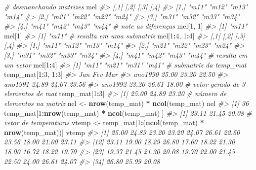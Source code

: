 \documentclass[]{book}
\newenvironment{Shaded}{\begin{snugshade}}{\end{snugshade}}
\newcommand{\KeywordTok}[1]{\textcolor[rgb]{0.13,0.29,0.53}{\textbf{#1}}}
\newcommand{\DecValTok}[1]{\textcolor[rgb]{0.00,0.00,0.81}{#1}}
\newcommand{\StringTok}[1]{\textcolor[rgb]{0.31,0.60,0.02}{#1}}
\newcommand{\CommentTok}[1]{\textcolor[rgb]{0.56,0.35,0.01}{\textit{#1}}}
\newcommand{\OperatorTok}[1]{\textcolor[rgb]{0.81,0.36,0.00}{\textbf{#1}}}
\newcommand{\NormalTok}[1]{#1}
\begin{document}
\begin{Shaded}
\begin{Highlighting}[]
\CommentTok{# desmanchando matrizes}
\NormalTok{mel}
\CommentTok{#>      [,1]  [,2]  [,3]  [,4] }
\CommentTok{#> [1,] "m11" "m12" "m13" "m14"}
\CommentTok{#> [2,] "m21" "m22" "m23" "m24"}
\CommentTok{#> [3,] "m31" "m32" "m33" "m34"}
\CommentTok{#> [4,] "m41" "m42" "m43" "m44"}
\CommentTok{# note as diferenças}
\NormalTok{mel[}\DecValTok{1}\NormalTok{, }\DecValTok{1}\NormalTok{]}
\CommentTok{#> [1] "m11"}
\NormalTok{mel[}\DecValTok{1}\NormalTok{]}
\CommentTok{#> [1] "m11"}
\CommentTok{# resulta em uma submatriz}
\NormalTok{mel[}\DecValTok{1}\OperatorTok{:}\DecValTok{4}\NormalTok{, }\DecValTok{1}\OperatorTok{:}\DecValTok{4}\NormalTok{]}
\CommentTok{#>      [,1]  [,2]  [,3]  [,4] }
\CommentTok{#> [1,] "m11" "m12" "m13" "m14"}
\CommentTok{#> [2,] "m21" "m22" "m23" "m24"}
\CommentTok{#> [3,] "m31" "m32" "m33" "m34"}
\CommentTok{#> [4,] "m41" "m42" "m43" "m44"}
\CommentTok{# resulta em um vetor}
\NormalTok{mel[}\DecValTok{1}\OperatorTok{:}\DecValTok{4}\NormalTok{]}
\CommentTok{#> [1] "m11" "m21" "m31" "m41"}
\CommentTok{# submatriz da temp_mat}
\NormalTok{temp_mat[}\DecValTok{1}\OperatorTok{:}\DecValTok{3}\NormalTok{, }\DecValTok{1}\OperatorTok{:}\DecValTok{3}\NormalTok{]}
\CommentTok{#>           Jan   Fev   Mar}
\CommentTok{#> ano1990 25.00 23.20 22.50}
\CommentTok{#> ano1991 24.89 24.07 23.56}
\CommentTok{#> ano1992 23.20 26.61 18.00}
\CommentTok{# vetor gerado de 3 elementos de mat}
\NormalTok{temp_mat[}\DecValTok{1}\OperatorTok{:}\DecValTok{3}\NormalTok{]}
\CommentTok{#> [1] 25.00 24.89 23.20}
\CommentTok{# número de elementos na matriz}
\NormalTok{nel <-}\StringTok{ }\KeywordTok{nrow}\NormalTok{(temp_mat) }\OperatorTok{*}\StringTok{ }\KeywordTok{ncol}\NormalTok{(temp_mat)}
\NormalTok{nel}
\CommentTok{#> [1] 36}
\NormalTok{temp_mat[}\DecValTok{1}\OperatorTok{:}\KeywordTok{nrow}\NormalTok{(temp_mat) }\OperatorTok{*}\StringTok{ }\KeywordTok{ncol}\NormalTok{(temp_mat) ]}
\CommentTok{#> [1] 23.11 21.45 20.08}
\CommentTok{# vetor de temperaturas}
\NormalTok{vtemp <-}\StringTok{ }\NormalTok{temp_mat[}\DecValTok{1}\OperatorTok{:}\NormalTok{(}\KeywordTok{ncol}\NormalTok{(temp_mat) }\OperatorTok{*}\StringTok{ }\KeywordTok{nrow}\NormalTok{(temp_mat))]}
\NormalTok{vtemp}
\CommentTok{#>  [1] 25.00 24.89 23.20 23.20 24.07 26.61 22.50 23.56 18.00 21.00 23.11}
\CommentTok{#> [12] 23.11 19.00 18.29 26.80 17.60 18.22 21.30 18.00 16.72 18.22 19.70}
\CommentTok{#> [23] 19.37 21.45 21.30 20.08 19.70 22.00 21.45 22.50 24.00 26.61 24.07}
\CommentTok{#> [34] 26.80 25.99 20.08}

\end{Highlighting}
\end{Shaded}
\end{document}
